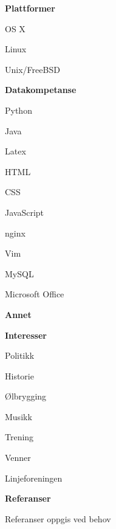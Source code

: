 \documentclass[a4paper,12pt,final]{memoir}
\newcommand{\Sep}{\vspace{1.5em}}
\newcommand{\SmallSep}{\vspace{0.5em}}
\newcommand{\CVSection}[1]
	{\Large\textbf{#1}\par
	\SmallSep\normalsize\normalfont}
\newcommand{\CVItem}[1]
	{\textbf{\color{RoyalBlue} #1}}
\begin{document}
\CVItem{Plattformer}
\begin{multicols}{3}
\begin{compactitem}[\color{RoyalBlue}$\circ$]
    \item OS X 
    \item Linux
    \item Unix/FreeBSD
\end{compactitem}
\end{multicols}
\SmallSep

\CVItem{Datakompetanse}
\begin{multicols}{3}
\begin{compactitem}[\color{RoyalBlue}$\circ$]
	\item Python 
	\item Java
	\item Latex 
	\item HTML
	\item CSS
    \item JavaScript
	\item nginx 
    \item Vim
	\item MySQL 
	\item Microsoft Office
\end{compactitem}
\end{multicols}
\SmallSep 

\CVSection{Annet}

\CVItem{Interesser}
\begin{multicols}{3}
\begin{compactitem}[\color{RoyalBlue}$\circ$]
	\item Politikk 
	\item Historie
	\item Ølbrygging 
	\item Musikk
	\item Trening
	\item Venner
	\item Linjeforeningen
\end{compactitem}
\end{multicols}
\Sep 

\CVSection{Referanser}
Referanser oppgis ved behov

\end{document}
